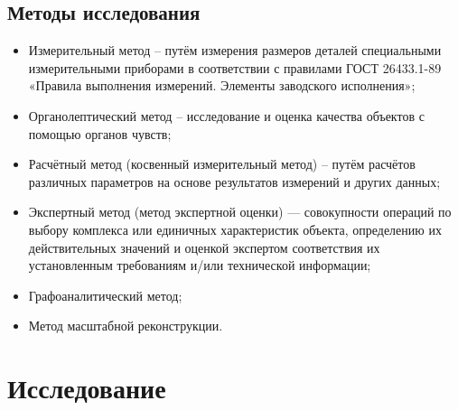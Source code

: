 \subsection{Методы исследования}

\begin{itemize}
\item 
Измерительный метод – путём измерения размеров деталей специальными измерительными приборами в соответствии с правилами ГОСТ 26433.1-89 «Правила выполнения измерений. Элементы заводского исполнения»;
\item  
Органолептический метод – исследование и оценка качества объектов с помощью органов чувств;
\item 
Расчётный метод (косвенный измерительный метод) – путём расчётов различных параметров на основе результатов измерений и других данных;
\item 
Экспертный метод (метод экспертной оценки) — совокупности операций по выбору комплекса или единичных характеристик объекта, определению их действительных значений и оценкой экспертом соответствия их установленным требованиям и/или технической информации;
\item 
Графоаналитический метод;
\item 
Метод масштабной  реконструкции.
\end{itemize}
%
%
%
%


\section{Исследование}

